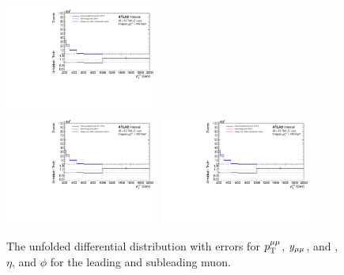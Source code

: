 \begin{figure}[h!]
  \includegraphics[page=380,width=0.45\textwidth]{figures/IBUPlots.pdf} \\
  \includegraphics[page=412,width=0.45\textwidth]{figures/IBUPlots.pdf}
  \includegraphics[page=444,width=0.45\textwidth]{figures/IBUPlots.pdf}
  \caption{The unfolded differential distribution with errors for $p_\mathrm{T}^{\mu\mu}$, $y_{\mu\mu}$, and \pt, $\eta$, and $\phi$ for the leading and subleading muon.}
  \label{fig:unfoldErr1}
\end{figure}

